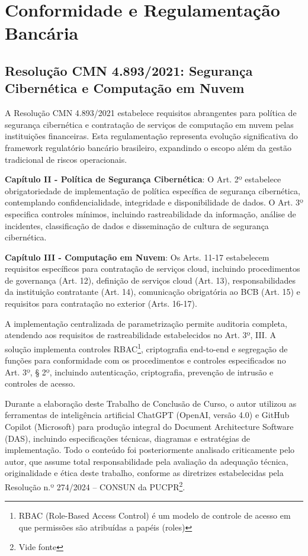 \section{Conformidade e Regulamentação Bancária}

\subsection{Resolução CMN 4.893/2021: Segurança Cibernética e Computação em Nuvem}


A Resolução CMN 4.893/2021 estabelece requisitos abrangentes para política de segurança cibernética e contratação de serviços de computação em nuvem pelas instituições financeiras. Esta regulamentação representa evolução significativa do framework regulatório bancário brasileiro, expandindo o escopo além da gestão tradicional de riscos operacionais.

\textbf{Capítulo II - Política de Segurança Cibernética}: O Art. 2º estabelece obrigatoriedade de implementação de política específica de segurança cibernética, contemplando confidencialidade, integridade e disponibilidade de dados. O Art. 3º especifica controles mínimos, incluindo rastreabilidade da informação, análise de incidentes, classificação de dados e disseminação de cultura de segurança cibernética.

\textbf{Capítulo III - Computação em Nuvem}: Os Arts. 11-17 estabelecem requisitos específicos para contratação de serviços cloud, incluindo procedimentos de governança (Art. 12), definição de serviços cloud (Art. 13), responsabilidades da instituição contratante (Art. 14), comunicação obrigatória ao BCB (Art. 15) e requisitos para contratação no exterior (Arts. 16-17).

A implementação centralizada de parametrização permite auditoria completa, atendendo aos requisitos de rastreabilidade estabelecidos no Art. 3º, III. A solução implementa controles RBAC\footnote{RBAC (Role-Based Access Control) é um modelo de controle de acesso em que permissões são atribuídas a papéis (roles)}, criptografia end-to-end e segregação de funções para conformidade com os procedimentos e controles especificados no Art. 3º, § 2º, incluindo autenticação, criptografia, prevenção de intrusão e controles de acesso.

Durante a elaboração deste Trabalho de Conclusão de Curso, o autor utilizou as ferramentas de inteligência artificial ChatGPT (OpenAI, versão 4.0) e GitHub Copilot (Microsoft) para produção integral do Document Architecture Software (DAS), incluindo especificações técnicas, diagramas e estratégias de implementação. Todo o conteúdo foi posteriormente analisado criticamente pelo autor, que assume total responsabilidade pela avaliação da adequação técnica, originalidade e ética deste trabalho, conforme as diretrizes estabelecidas pela Resolução n.º 274/2024 – CONSUN da PUCPR\footnote{Vide fonte }.

